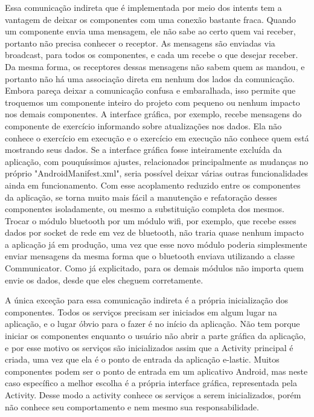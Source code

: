 Essa comunicação indireta que é implementada por meio dos intents tem a vantagem de deixar os componentes com uma conexão bastante fraca. Quando um componente envia uma mensagem, ele não sabe ao certo quem vai receber, portanto não precisa conhecer o receptor. As mensagens são enviadas via broadcast, para todos os componentes, e cada um recebe o que desejar receber. Da mesma forma, os receptores dessas mensagens não sabem quem as mandou, e portanto não há uma associação direta em nenhum dos lados da comunicação. Embora pareça deixar a comunicação confusa e embaralhada, isso permite que troquemos um componente inteiro do projeto com pequeno ou nenhum impacto nos demais componentes. A interface gráfica, por exemplo, recebe mensagens do componente de exercício informando sobre atualizações nos dados. Ela não conhece o exercício em execução e o exercício em execução não conhece quem está mostrando seus dados. Se a interface gráfica fosse inteiramente excluída da aplicação, com pouquíssimos ajustes, relacionados principalmente as mudanças no próprio "AndroidManifest.xml", seria possível deixar várias outras funcionalidades ainda em funcionamento. Com esse acoplamento reduzido entre os componentes da aplicação, se torna muito mais fácil a manutenção e refatoração desses componentes isoladamente, ou mesmo a substituição completa dos mesmos. Trocar o módulo bluetooth por um módulo wifi, por exemplo, que recebe esses dados por socket de rede em vez de bluetooth, não traria quase nenhum impacto a aplicação já em produção, uma vez que esse novo módulo poderia simplesmente enviar mensagens da mesma forma que o bluetooth enviava utilizando a classe Communicator. Como já explicitado, para os demais módulos não importa quem envie os dados, desde que eles cheguem corretamente. 

A única exceção para essa comunicação indireta é a própria inicialização dos componentes. Todos os serviços precisam ser iniciados em algum lugar na aplicação, e o lugar óbvio para o fazer é no início da aplicação. Não tem porque iniciar os componentes enquanto o usuário não abrir a parte gráfica da aplicação, e por esse motivo os serviços são inicializados assim que a Activity principal é criada, uma vez que ela é o ponto de entrada da aplicação e-lastic. Muitos componentes podem ser o ponto de entrada em um aplicativo Android, mas neste caso específico a melhor escolha é a própria interface gráfica, representada pela Activity. Desse modo a activity conhece os serviços a serem inicializados, porém não conhece seu comportamento e nem mesmo sua responsabilidade.

